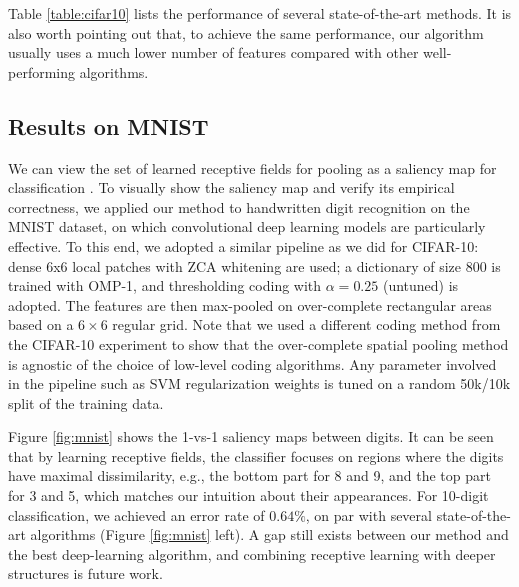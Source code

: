 Table \ref{table:cifar10} lists the performance of several state-of-the-art methods. It is also worth pointing out that, to achieve the same performance, our algorithm usually uses a much lower number of features compared with other well-performing algorithms.

\subsection{Results on MNIST}
We can view the set of learned receptive fields for pooling as a saliency map for classification \cite{Itti:2001wa}. To visually show the saliency map and verify its empirical correctness, we applied our method to handwritten digit recognition on the MNIST dataset, on which convolutional deep learning models are particularly effective. To this end, we adopted a similar pipeline as we did for CIFAR-10: dense 6x6 local patches with ZCA whitening are used; a dictionary of size $800$ is trained with OMP-1, and thresholding coding with $\alpha=0.25$ (untuned) is adopted. The features are then max-pooled on over-complete rectangular areas based on a $6\times 6$ regular grid. Note that we used a different coding method from the CIFAR-10 experiment to show that the over-complete spatial pooling method is agnostic of the choice of low-level coding algorithms. Any parameter involved in the pipeline such as SVM regularization weights is tuned on a random 50k/10k split of the training data.

Figure \ref{fig:mnist} shows the 1-vs-1 saliency maps between digits. It can be seen that by learning receptive fields, the classifier focuses on regions where the digits have maximal dissimilarity, e.g., the bottom part for 8 and 9, and the top part for 3 and 5, which matches our intuition about their appearances. For 10-digit classification, we achieved an error rate of $0.64\%$, on par with several state-of-the-art algorithms (Figure \ref{fig:mnist} left). A gap still exists between our method and the best deep-learning algorithm, and combining receptive learning with deeper structures is future work.

